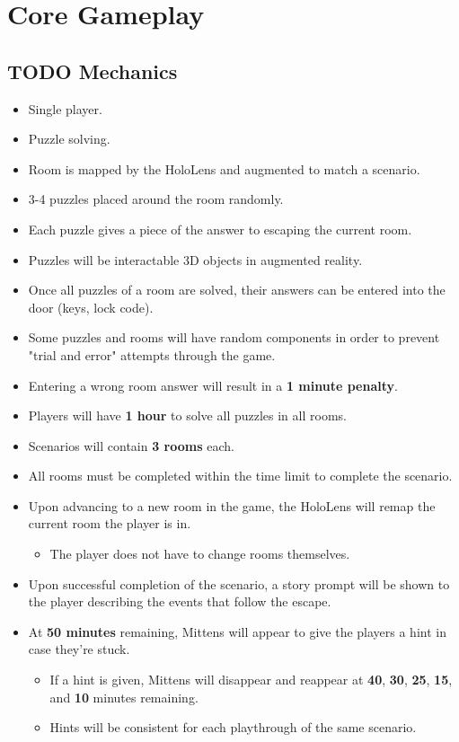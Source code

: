 \documentclass[11pt]{article}
\begin{document}
\section{Core Gameplay}
\label{sec:orgf0fd323}
\subsection{{\bfseries\sffamily TODO} Mechanics}
\label{sec:org077fc69}
\begin{itemize}
\item Single player.
\item Puzzle solving.
\item Room is mapped by the HoloLens and augmented to match a scenario.
\item 3-4 puzzles placed around the room randomly.
\item Each puzzle gives a piece of the answer to escaping the current room.
\item Puzzles will be interactable 3D objects in augmented reality.
\item Once all puzzles of a room are solved, their answers can be entered into the door (keys, lock code).
\item Some puzzles and rooms will have random components in order to prevent "trial and error" attempts through the game.
\item Entering a wrong room answer will result in a \textbf{1 minute penalty}.
\item Players will have \textbf{1 hour} to solve all puzzles in all rooms.
\item Scenarios will contain \textbf{3 rooms} each.
\item All rooms must be completed within the time limit to complete the scenario.
\item Upon advancing to a new room in the game, the HoloLens will remap the current room the player is in.
\begin{itemize}
\item The player does not have to change rooms themselves.
\end{itemize}
\item Upon successful completion of the scenario, a story prompt will be shown to the player describing the events that follow the escape.
\item At \textbf{50 minutes} remaining, Mittens will appear to give the players a hint in case they're stuck.
\begin{itemize}
\item If a hint is given, Mittens will disappear and reappear at \textbf{40}, \textbf{30}, \textbf{25}, \textbf{15}, and \textbf{10} minutes remaining.
\item Hints will be consistent for each playthrough of the same scenario.
\end{itemize}
\end{itemize}
\end{document}
